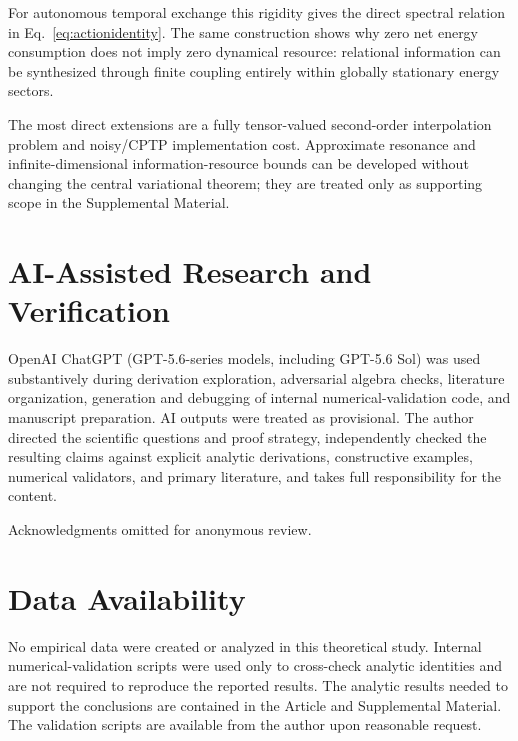 \documentclass[aps,pra,preprint,nofootinbib]{revtex4-2}
\begin{document}
For autonomous temporal exchange this rigidity gives the direct spectral relation in Eq.~\eqref{eq:actionidentity}. The same construction shows why zero net energy consumption does not imply zero dynamical resource: relational information can be synthesized through finite coupling entirely within globally stationary energy sectors.

The most direct extensions are a fully tensor-valued second-order interpolation problem and noisy/CPTP implementation cost. Approximate resonance and infinite-dimensional information-resource bounds can be developed without changing the central variational theorem; they are treated only as supporting scope in the Supplemental Material.

\section*{AI-Assisted Research and Verification}
OpenAI ChatGPT (GPT-5.6-series models, including GPT-5.6 Sol) was used substantively during derivation exploration, adversarial algebra checks, literature organization, generation and debugging of internal numerical-validation code, and manuscript preparation. AI outputs were treated as provisional. The author directed the scientific questions and proof strategy, independently checked the resulting claims against explicit analytic derivations, constructive examples, numerical validators, and primary literature, and takes full responsibility for the content.

\begin{acknowledgments}
Acknowledgments omitted for anonymous review.
\end{acknowledgments}

\section*{Data Availability}
No empirical data were created or analyzed in this theoretical study. Internal numerical-validation scripts were used only to cross-check analytic identities and are not required to reproduce the reported results. The analytic results needed to support the conclusions are contained in the Article and Supplemental Material. The validation scripts are available from the author upon reasonable request.


\end{document}
